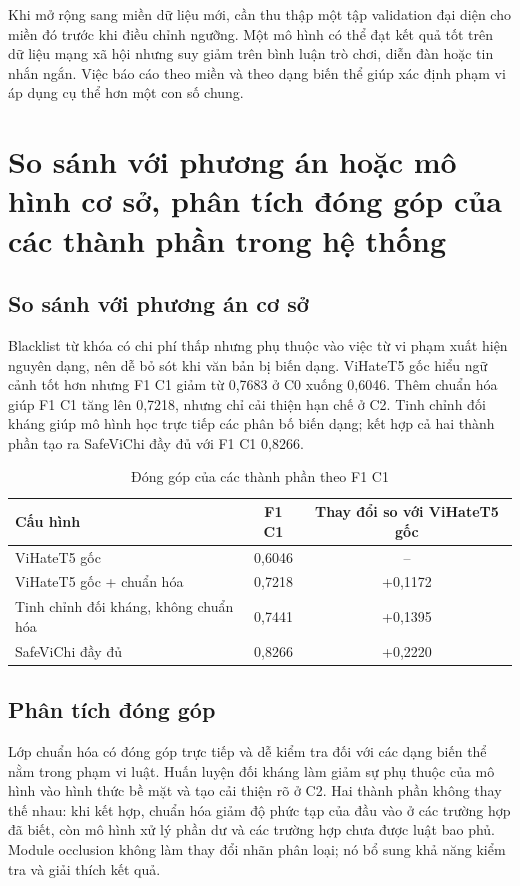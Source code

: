 \documentclass[12pt,a4paper]{article}
\begin{document}
Khi mở rộng sang miền dữ liệu mới, cần thu thập một tập validation đại diện cho miền đó trước khi điều chỉnh ngưỡng. Một mô hình có thể đạt kết quả tốt trên dữ liệu mạng xã hội nhưng suy giảm trên bình luận trò chơi, diễn đàn hoặc tin nhắn ngắn. Việc báo cáo theo miền và theo dạng biến thể giúp xác định phạm vi áp dụng cụ thể hơn một con số chung.

\section{So sánh với phương án hoặc mô hình cơ sở, phân tích đóng góp của các thành phần trong hệ thống}
\subsection{So sánh với phương án cơ sở}
Blacklist từ khóa có chi phí thấp nhưng phụ thuộc vào việc từ vi phạm xuất hiện nguyên dạng, nên dễ bỏ sót khi văn bản bị biến dạng. ViHateT5 gốc hiểu ngữ cảnh tốt hơn nhưng F1 C1 giảm từ 0,7683 ở C0 xuống 0,6046. Thêm chuẩn hóa giúp F1 C1 tăng lên 0,7218, nhưng chỉ cải thiện hạn chế ở C2. Tinh chỉnh đối kháng giúp mô hình học trực tiếp các phân bố biến dạng; kết hợp cả hai thành phần tạo ra SafeViChi đầy đủ với F1 C1 0,8266.

\begin{table}[H]
\centering
\caption{Đóng góp của các thành phần theo F1 C1}
\label{tab:ablation}
\begin{tabular}{lcc}
\toprule
\textbf{Cấu hình} & \textbf{F1 C1} & \textbf{Thay đổi so với ViHateT5 gốc}\\
\midrule
ViHateT5 gốc & 0,6046 & --\\
ViHateT5 gốc + chuẩn hóa & 0,7218 & +0,1172\\
Tinh chỉnh đối kháng, không chuẩn hóa & 0,7441 & +0,1395\\
SafeViChi đầy đủ & 0,8266 & +0,2220\\
\bottomrule
\end{tabular}
\end{table}

\subsection{Phân tích đóng góp}
Lớp chuẩn hóa có đóng góp trực tiếp và dễ kiểm tra đối với các dạng biến thể nằm trong phạm vi luật. Huấn luyện đối kháng làm giảm sự phụ thuộc của mô hình vào hình thức bề mặt và tạo cải thiện rõ ở C2. Hai thành phần không thay thế nhau: khi kết hợp, chuẩn hóa giảm độ phức tạp của đầu vào ở các trường hợp đã biết, còn mô hình xử lý phần dư và các trường hợp chưa được luật bao phủ. Module occlusion không làm thay đổi nhãn phân loại; nó bổ sung khả năng kiểm tra và giải thích kết quả.
\end{document}
